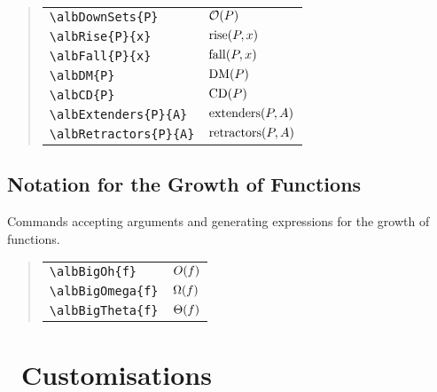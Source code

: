 \documentclass[11pt,a4paper,oneside]{alb-corp}
\begin{document}
\begin{quote}
  \begin{tabular}{p{}@{\qquad}p{}}
    \verb$\albDownSets{P}$ & $\mathcal{O}(P)$ \\
    \verb$\albRise{P}{x}$ & $\operatorname{rise}(P, x)$ \\
    \verb$\albFall{P}{x}$ & $\operatorname{fall}(P, x)$ \\
    \verb$\albDM{P}$ & $\operatorname{DM}(P)$ \\
    \verb$\albCD{P}$ & $\operatorname{CD}(P)$ \\
    \verb$\albExtenders{P}{A}$ & $\operatorname{extenders}(P, A)$ \\
    \verb$\albRetractors{P}{A}$ & $\operatorname{retractors}(P, A)$
  \end{tabular}
\end{quote}



\subsection{Notation for the Growth of Functions}
\label{sec:alb-order-theory-documentation:notat-growth-funct}

Commands accepting arguments and generating expressions for the growth
of functions.

\begin{quote}
  \begin{tabular}{p{}@{\qquad}p{}}
    \verb$\albBigOh{f}$ & $O(f)$ \\
    \verb$\albBigOmega{f}$ & $\Omega(f)$ \\
    \verb$\albBigTheta{f}$ & $\Theta(f)$
  \end{tabular}
\end{quote}




\section{\AUCTeX\ Customisations}
\label{sec:alb-order-theory-documentation:auctex-cust}
\end{document}
